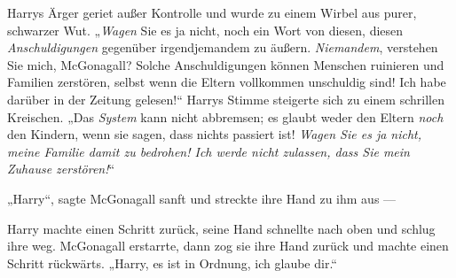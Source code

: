 Harrys Ärger geriet außer Kontrolle und wurde zu einem Wirbel aus purer, schwarzer Wut.
„\emph{Wagen} Sie es ja nicht, noch ein Wort von diesen, diesen \emph{Anschuldigungen} gegenüber irgendjemandem zu äußern. \emph{Niemandem}, verstehen Sie mich, McGonagall? Solche Anschuldigungen können Menschen ruinieren und Familien zerstören, selbst wenn die Eltern vollkommen unschuldig sind! Ich habe darüber in der Zeitung gelesen!“ Harrys Stimme steigerte sich zu einem schrillen Kreischen.
„Das \emph{System} kann nicht abbremsen; es glaubt weder den Eltern \emph{noch} den Kindern, wenn sie sagen, dass nichts passiert ist! \emph{Wagen Sie es ja nicht, meine Familie damit zu bedrohen! Ich werde nicht zulassen, dass Sie mein Zuhause zerstören!}“

„Harry“, sagte McGonagall sanft und streckte ihre Hand zu ihm aus —

Harry machte einen Schritt zurück, seine Hand schnellte nach oben und schlug ihre weg.
McGonagall erstarrte, dann zog sie ihre Hand zurück und machte einen Schritt rückwärts.
„Harry, es ist in Ordnung, ich glaube dir.“

